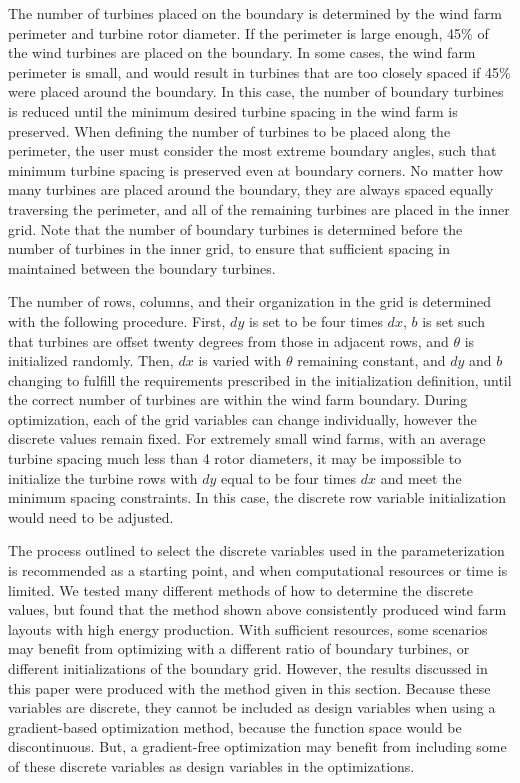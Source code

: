 \documentclass[wes, manuscript]{copernicus}
\begin{document}
The number of turbines placed on the boundary is determined by the wind farm perimeter and turbine rotor diameter. If the perimeter is large enough, 45\% of the wind turbines are placed on the boundary. In some cases, the wind farm perimeter is small, and would result in turbines that are too closely spaced if 45\% were placed around the boundary. 
In this case, the number of boundary turbines is reduced until the minimum desired turbine spacing in the wind farm is preserved. 
When defining the number of turbines to be placed along the perimeter, the user must consider the most extreme boundary angles, such that minimum turbine spacing is preserved even at boundary corners.
No matter how many turbines are placed around the boundary, they are always spaced equally traversing the perimeter, and all of the remaining turbines are placed in the inner grid. Note that the number of boundary turbines is determined before the number of turbines in the inner grid, to ensure that sufficient spacing in maintained between the boundary turbines.

The number of rows, columns, and their organization in the grid is determined with the following procedure. First, $dy$ is set to be four times $dx$, $b$ is set such that turbines are offset twenty degrees from those in adjacent rows, and $\theta$ is initialized randomly. 
Then, $dx$ is varied with $\theta$ remaining constant, and $dy$ and $b$ changing to fulfill the requirements prescribed in the initialization definition, until the correct number of turbines are within the wind farm boundary. During optimization, each of the grid variables can change individually, however the discrete values remain fixed. For extremely small wind farms, with an average turbine spacing much less than 4 rotor diameters, it may be impossible to initialize the turbine rows with $dy$ equal to be four times $dx$ and meet the minimum spacing constraints. In this case, the discrete row variable initialization would need to be adjusted. 

The process outlined to select the discrete variables used in the parameterization is recommended as a starting point, and when computational resources or time is limited. We tested many different methods of how to determine the discrete values, but found that the method shown above consistently produced wind farm layouts with high energy production. With sufficient resources, some scenarios may benefit from optimizing with a different ratio of boundary turbines, or different initializations of the boundary grid. However, the results discussed in this paper were produced with the method given in this section. Because these variables are discrete, they cannot be included as design variables when using a gradient-based optimization method, because the function space would be discontinuous. But, a gradient-free optimization may benefit from including some of these discrete variables as design variables in the optimizations.
\end{document}
